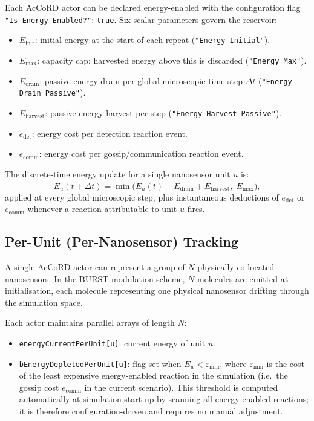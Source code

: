 \documentclass[journal]{IEEEtran}
\begin{document}
Each AcCoRD actor can be declared energy-enabled with the configuration flag
\texttt{"Is Energy Enabled?"}: \texttt{true}. Six scalar parameters govern the
reservoir:

\begin{itemize}
  \item $E_\mathrm{init}$: initial energy at the start of each repeat
        (\texttt{"Energy Initial"}).
  \item $E_\mathrm{max}$: capacity cap; harvested energy above this is
        discarded (\texttt{"Energy Max"}).
  \item $\dot{E}_\mathrm{drain}$: passive energy drain per global microscopic
        time step $\Delta t$ (\texttt{"Energy Drain Passive"}).
  \item $\dot{E}_\mathrm{harvest}$: passive energy harvest per step
        (\texttt{"Energy Harvest Passive"}).
  \item $e_\mathrm{det}$: energy cost per detection reaction event.
  \item $e_\mathrm{comm}$: energy cost per gossip/communication reaction event.
\end{itemize}

The discrete-time energy update for a single nanosensor unit $u$ is:
\begin{equation}
  E_u(t + \Delta t) =
    \min\!\bigl(E_u(t) - \dot{E}_\mathrm{drain} + \dot{E}_\mathrm{harvest},\;
               E_\mathrm{max}\bigr),
  \label{eq:passive}
\end{equation}
applied at every global microscopic step, plus instantaneous deductions of
$e_\mathrm{det}$ or $e_\mathrm{comm}$ whenever a reaction attributable to
unit $u$ fires.

\subsection{Per-Unit (Per-Nanosensor) Tracking}

A single AcCoRD actor can represent a group of $N$ physically co-located
nanosensors. In the BURST modulation scheme, $N$ molecules are emitted at
initialisation, each molecule representing one physical nanosensor drifting
through the simulation space.

Each actor maintains parallel arrays of length $N$:
\begin{itemize}
  \item \texttt{energyCurrentPerUnit[u]}: current energy of unit $u$.
  \item \texttt{bEnergyDepletedPerUnit[u]}: flag set when
        $E_u < \varepsilon_\mathrm{min}$, where $\varepsilon_\mathrm{min}$ is
        the cost of the least expensive energy-enabled reaction in the
        simulation (i.e.\ the gossip cost $e_\mathrm{comm}$ in the current
        scenario). This threshold is computed automatically at simulation
        start-up by scanning all energy-enabled reactions; it is therefore
        configuration-driven and requires no manual adjustment.
\end{itemize}
\end{document}
